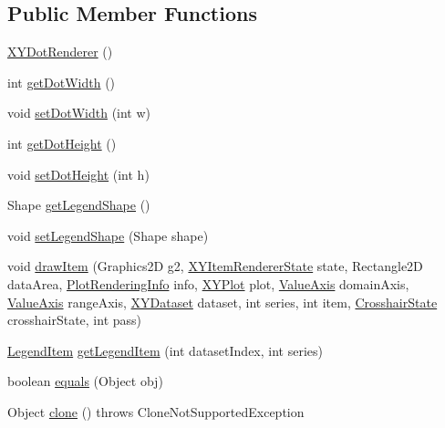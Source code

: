 \subsection*{Public Member Functions}
\begin{DoxyCompactItemize}
\item 
\mbox{\hyperlink{classorg_1_1jfree_1_1chart_1_1renderer_1_1xy_1_1_x_y_dot_renderer_afdfcd69a10b175715622085328619f6e}{X\+Y\+Dot\+Renderer}} ()
\item 
int \mbox{\hyperlink{classorg_1_1jfree_1_1chart_1_1renderer_1_1xy_1_1_x_y_dot_renderer_a957cd27a2e53b0caf7675f6abe030df5}{get\+Dot\+Width}} ()
\item 
void \mbox{\hyperlink{classorg_1_1jfree_1_1chart_1_1renderer_1_1xy_1_1_x_y_dot_renderer_a7c04419e31f770ce4ad7c59bb8ed6228}{set\+Dot\+Width}} (int w)
\item 
int \mbox{\hyperlink{classorg_1_1jfree_1_1chart_1_1renderer_1_1xy_1_1_x_y_dot_renderer_ab274478be9bf3d846732b90953e543b1}{get\+Dot\+Height}} ()
\item 
void \mbox{\hyperlink{classorg_1_1jfree_1_1chart_1_1renderer_1_1xy_1_1_x_y_dot_renderer_a6467c5313ad8b1275bb4e6a341b85e90}{set\+Dot\+Height}} (int h)
\item 
Shape \mbox{\hyperlink{classorg_1_1jfree_1_1chart_1_1renderer_1_1xy_1_1_x_y_dot_renderer_aa0a732764f5d566c2688798efe0b3733}{get\+Legend\+Shape}} ()
\item 
void \mbox{\hyperlink{classorg_1_1jfree_1_1chart_1_1renderer_1_1xy_1_1_x_y_dot_renderer_aef7933f6f0c55e2a3d79c989d2d5c950}{set\+Legend\+Shape}} (Shape shape)
\item 
void \mbox{\hyperlink{classorg_1_1jfree_1_1chart_1_1renderer_1_1xy_1_1_x_y_dot_renderer_a7e5f2af6bd02f506a5def497674c579d}{draw\+Item}} (Graphics2D g2, \mbox{\hyperlink{classorg_1_1jfree_1_1chart_1_1renderer_1_1xy_1_1_x_y_item_renderer_state}{X\+Y\+Item\+Renderer\+State}} state, Rectangle2D data\+Area, \mbox{\hyperlink{classorg_1_1jfree_1_1chart_1_1plot_1_1_plot_rendering_info}{Plot\+Rendering\+Info}} info, \mbox{\hyperlink{classorg_1_1jfree_1_1chart_1_1plot_1_1_x_y_plot}{X\+Y\+Plot}} plot, \mbox{\hyperlink{classorg_1_1jfree_1_1chart_1_1axis_1_1_value_axis}{Value\+Axis}} domain\+Axis, \mbox{\hyperlink{classorg_1_1jfree_1_1chart_1_1axis_1_1_value_axis}{Value\+Axis}} range\+Axis, \mbox{\hyperlink{interfaceorg_1_1jfree_1_1data_1_1xy_1_1_x_y_dataset}{X\+Y\+Dataset}} dataset, int series, int item, \mbox{\hyperlink{classorg_1_1jfree_1_1chart_1_1plot_1_1_crosshair_state}{Crosshair\+State}} crosshair\+State, int pass)
\item 
\mbox{\hyperlink{classorg_1_1jfree_1_1chart_1_1_legend_item}{Legend\+Item}} \mbox{\hyperlink{classorg_1_1jfree_1_1chart_1_1renderer_1_1xy_1_1_x_y_dot_renderer_ad9762d5dbf4d25f6090d37c25a6a63a5}{get\+Legend\+Item}} (int dataset\+Index, int series)
\item 
boolean \mbox{\hyperlink{classorg_1_1jfree_1_1chart_1_1renderer_1_1xy_1_1_x_y_dot_renderer_ae1ae5293645c355b40cb8ab050f9fae8}{equals}} (Object obj)
\item 
Object \mbox{\hyperlink{classorg_1_1jfree_1_1chart_1_1renderer_1_1xy_1_1_x_y_dot_renderer_a2dff0d7f1e41b0304a227012a82c79d3}{clone}} ()  throws Clone\+Not\+Supported\+Exception 
\end{DoxyCompactItemize}
